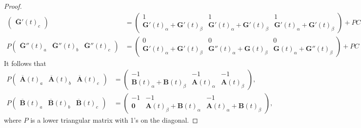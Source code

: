 \documentclass[12pt,reqno]{amsart}
\theoremstyle{definition}
\begin{document}
\begin{proof}
{\begin{equation}
\begin{aligned}
\begin{pmatrix}
\overline{\mathbf{G}}'(t)_{c} 
\end{pmatrix}&=\begin{pmatrix}
1& 1 & 1\\
\mathbf{G}'(t)_{ \alpha} + \mathbf{G}'(t)_{\beta} &  
\mathbf{G}'(t)_{ \alpha} + \mathbf{G}'(t)_{\beta} & 
\mathbf{G}'(t)_{ \alpha} + \mathbf{G}'(t)_{\beta}
\end{pmatrix}+ PC, \\
P \begin{pmatrix}
\overline{\mathbf{G}}''(t)_{a} &
\overline{\mathbf{G}}''(t)_{b} & 
\overline{\mathbf{G}}''(t)_{c} 
\end{pmatrix}
&= \begin{pmatrix}
0& 0 & 0\\
\mathbf{G}'(t)_{\alpha} + \mathbf{G}'(t)_{\beta} &  
\mathbf{G}''(t)_{\alpha} + \mathbf{G}(t)_{\beta}& 
\mathbf{G}(t)_{\alpha} + \mathbf{G}''(t)_{\beta} 
\end{pmatrix} + PC \, .
\end{aligned}
\end{equation}
}
It follows that  
\begin{equation*}
\begin{aligned}
P\begin{pmatrix}
\overline{\mathbf{A}}(t)_{a} &
\overline{\mathbf{A}}(t)_{b} & 
\overline{\mathbf{A}}(t)_{c}
\end{pmatrix}
&= \begin{pmatrix}
-1& -1 & -1\\
\mathbf{B}(t)_{ \alpha} + \mathbf{B}(t)_{\beta} &  
\mathbf{A}(t)_{ \alpha} & 
\mathbf{A}(t)_{\beta} 
\end{pmatrix}, \\
P \begin{pmatrix}
\overline{\mathbf{B}}(t)_{a} &
\overline{\mathbf{B}}(t)_{b} & 
\overline{\mathbf{B}}(t)_{c} 
\end{pmatrix}
&= \begin{pmatrix}
-1& -1 & -1\\
\mathbf{0} &  
\mathbf{A}(t)_{ \beta}+ \mathbf{B}(t)_{ \alpha} & 
\mathbf{A}(t)_{ \alpha} + \mathbf{B}(t)_{\beta} 
\end{pmatrix},
\end{aligned}
\end{equation*}
where $P$ is a lower triangular matrix with 1's on the diagonal.
\end{proof}

\end{document}
